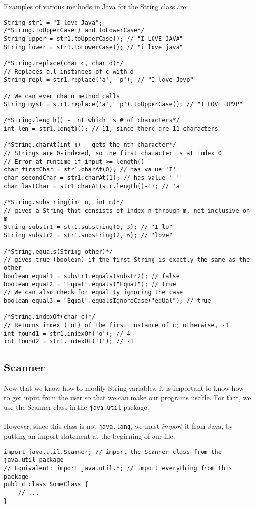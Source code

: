 \noindent Examples of various methods in Java for the String class are:
\begin{lstlisting}
String str1 = "I love Java";
/*String.toUpperCase() and toLowerCase*/
String upper = str1.toUpperCase(); // "I LOVE JAVA"
String lower = str1.toLowerCase(); // "i love java"

/*String.replace(char c, char d)*/
// Replaces all instances of c with d
String repl = str1.replace('a', 'p'); // "I love Jpvp"

// We can even chain method calls
String myst = str1.replace('a', 'p').toUpperCase(); // "I LOVE JPVP"

/*String.length() - int which is # of characters*/
int len = str1.length(); // 11, since there are 11 characters

/*String.charAt(int n) - gets the nth character*/
// Strings are 0-indexed, so the first character is at index 0
// Error at runtime if input >= length()
char firstChar = str1.charAt(0); // has value 'I'
char secondChar = str1.charAt(1); // has value ' '
char lastChar = str1.charAt(str.length()-1); // 'a'

/*String.substring(int n, int m)*/
// gives a String that consists of index n through m, not inclusive on m
String substr1 = str1.substring(0, 3); // "I lo"
String substr2 = str1.substring(2, 6); // "love"

/*String.equals(String other)*/
// gives true (boolean) if the first String is exactly the same as the other
boolean equal1 = substr1.equals(substr2); // false
boolean equal2 = "Equal".equals("Equal"); // true
// We can also check for equality ignoring the case
boolean equal3 = "Equal".equalsIgnoreCase("eqUal"); // true

/*String.indexOf(char c)*/
// Returns index (int) of the first instance of c; otherwise, -1
int found1 = str1.indexOf('o'); // 4
int found2 = str1.indexOf('f'); // -1
\end{lstlisting}

\subsection{Scanner}
Now that we know how to modify String variables, it is important to know how to get input from the user so that we can make our programs usable. For that, we use the Scanner class in the \verb|java.util| package.
\\ \\
However, since this class is not \verb|java.lang|, we must $import$ it from Java, by putting an import statement at the beginning of our file:
\begin{lstlisting}
import java.util.Scanner; // import the Scanner class from the java.util package
// Equivalent: import java.util.*; // import everything from this package
public class SomeClass {
	// ...
}
\end{lstlisting}

